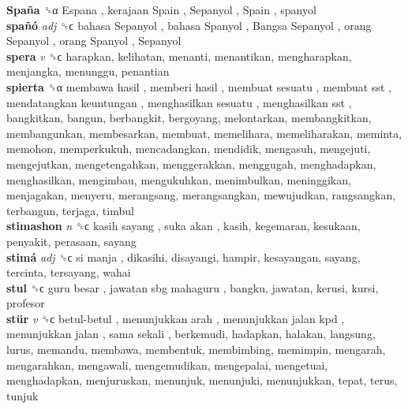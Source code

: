 \textbf{Spaña} ␝α   Espana ,  kerajaan Spain ,  Sepanyol ,  Spain , spanyol  \\
\textbf{spañó} \emph{adj}  ␝ϲ   bahasa Sepanyol ,  bahasa Spanyol ,  Bangsa Sepanyol ,  orang Sepanyol ,  orang Spanyol ,  Sepanyol   \\
\textbf{spera} \emph{v}  ␝ϲ  harapkan, kelihatan, menanti, menantikan, mengharapkan, menjangka, menunggu, penantian  \\
\textbf{spierta} ␝α   membawa hasil ,  memberi hasil ,  membuat sesuatu ,  membuat sst ,  mendatangkan keuntungan ,  menghasilkan sesuatu ,  menghasilkan sst , bangkitkan, bangun, berbangkit, bergoyang, melontarkan, membangkitkan, membangunkan, membesarkan, membuat, memelihara, memeliharakan, meminta, memohon, memperkukuh, mencadangkan, mendidik, mengasuh, mengejuti, mengejutkan, mengetengahkan, menggerakkan, menggugah, menghadapkan, menghasilkan, mengimbau, mengukuhkan, menimbulkan, meninggikan, menjagakan, menyeru, merangsang, merangsangkan, mewujudkan, rangsangkan, terbangun, terjaga, timbul  \\
\textbf{stimashon} \emph{n}  ␝ϲ   kasih sayang ,  suka akan , kasih, kegemaran, kesukaan, penyakit, perasaan, sayang  \\
\textbf{stimá} \emph{adj}  ␝ϲ   si manja , dikasihi, disayangi, hampir, kesayangan, sayang, tercinta, tersayang, wahai  \\
\textbf{stul} ␝ϲ   guru besar ,  jawatan sbg mahaguru , bangku, jawatan, kerusi, kursi, profesor  \\
\textbf{stür} \emph{v}  ␝ϲ   betul-betul ,  menunjukkan arah ,  menunjukkan jalan kpd ,  menunjukkan jalan ,  sama sekali , berkemudi, hadapkan, halakan, langsung, lurus, memandu, membawa, membentuk, membimbing, memimpin, mengarah, mengarahkan, mengawali, mengemudikan, mengepalai, mengetuai, menghadapkan, menjuruskan, menunjuk, menunjuki, menunjukkan, tepat, terus, tunjuk  \\
